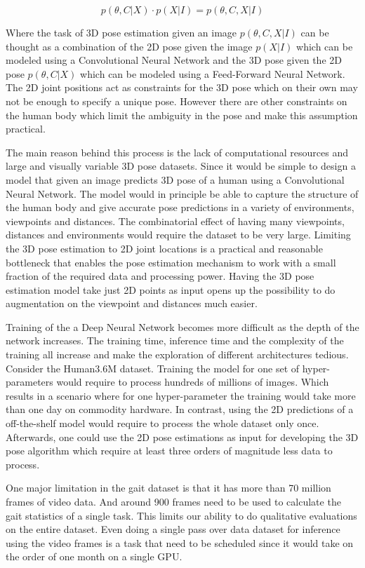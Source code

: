 \begin{equation}
    p(\theta,C|X) \cdot p(X|I)= p(\theta,C,X|I)
\end{equation}

Where the task of 3D pose estimation given an image $p(\theta,C,X|I)$ can be thought as a combination of the 2D pose given the image $p(X|I)$ which can be modeled using a Convolutional Neural Network and the 3D pose given the 2D pose $p(\theta,C|X)$ which can be modeled using a Feed-Forward Neural Network. The 2D joint positions act as constraints for the 3D pose which on their own may not be enough to specify a unique pose. However there are other constraints on the human body which limit the ambiguity in the pose and make this assumption practical. 

The main reason behind this process is the lack of computational resources and large and visually variable 3D pose datasets. Since it would be simple to design a model that given an image predicts 3D pose of a human using a Convolutional Neural Network. The model would in principle be able to capture the structure of the human body and give accurate pose predictions in a variety of environments, viewpoints and distances. The combinatorial effect of having many viewpoints, distances and environments would require the dataset to be very large. Limiting the 3D pose estimation to 2D joint locations is a practical and reasonable bottleneck that enables the pose estimation mechanism to work with a small fraction of the required data and processing power. Having the 3D pose estimation model take just 2D points as input opens up the possibility to do augmentation on the viewpoint and distances much easier. 

Training of the a Deep Neural Network becomes more difficult as the depth of the network increases. The training time, inference time and the complexity of the training all increase and make the exploration of different architectures tedious. 
Consider the Human3.6M dataset. Training the model for one set of hyper-parameters would require to process hundreds of millions of images. Which results in a scenario where for one hyper-parameter the training would take more than one day on commodity hardware. In contrast, using the 2D predictions of a off-the-shelf model would require to process the whole dataset only once. Afterwards, one could use the 2D pose estimations as input for developing the 3D pose algorithm which require at least three orders of magnitude less data to process.

One major limitation in the gait dataset is that it has more than 70 million frames of video data. And around 900 frames need to be used to calculate the gait statistics of a single task. This limits our ability to do qualitative evaluations on the entire dataset. Even doing a single pass over data dataset for inference using the video frames is a task that need to be scheduled since it would take on the order of one month on a single GPU. 

